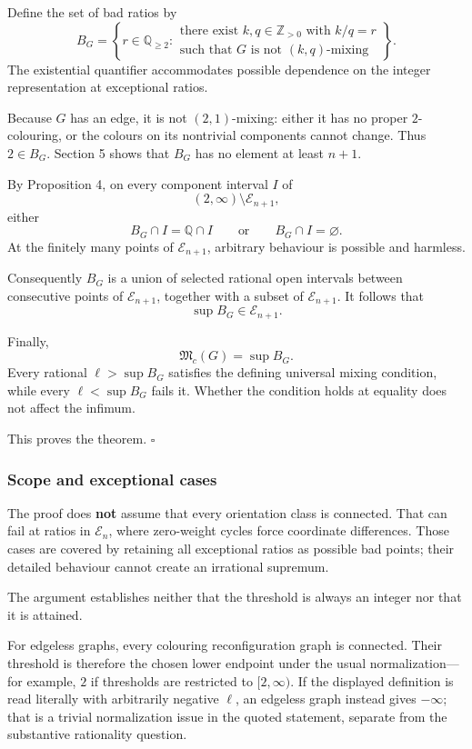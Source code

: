 \documentclass[
  11pt,
  a4paper,
]{article}
\begin{document}
Define the set of bad ratios by \[
B_G=
\left\{
r\in\mathbb Q_{\ge2}:
\begin{array}{l}
\text{there exist }k,q\in\mathbb Z_{>0}\text{ with }k/q=r\\
\text{such that }G\text{ is not }(k,q)\text{-mixing}
\end{array}
\right\}.
\] The existential quantifier accommodates possible dependence on the
integer representation at exceptional ratios.

Because \(G\) has an edge, it is not \((2,1)\)-mixing: either it has no
proper \(2\)-colouring, or the colours on its nontrivial components
cannot change. Thus \(2\in B_G\). Section 5 shows that \(B_G\) has no
element at least \(n+1\).

By Proposition 4, on every component interval \(I\) of \[
(2,\infty)\setminus\mathcal E_{n+1},
\] either \[
B_G\cap I=\mathbb Q\cap I
\qquad\text{or}\qquad
B_G\cap I=\varnothing.
\] At the finitely many points of \(\mathcal E_{n+1}\), arbitrary
behaviour is possible and harmless.

Consequently \(B_G\) is a union of selected rational open intervals
between consecutive points of \(\mathcal E_{n+1}\), together with a
subset of \(\mathcal E_{n+1}\). It follows that \[
\sup B_G\in\mathcal E_{n+1}.
\]

Finally, \[
\mathfrak M_c(G)=\sup B_G.
\] Every rational \(\ell>\sup B_G\) satisfies the defining universal
mixing condition, while every \(\ell<\sup B_G\) fails it. Whether the
condition holds at equality does not affect the infimum.

This proves the theorem. \(\square\)

\subsubsection{Scope and exceptional
cases}\label{scope-and-exceptional-cases}

The proof does \textbf{not} assume that every orientation class is
connected. That can fail at ratios in \(\mathcal E_n\), where
zero-weight cycles force coordinate differences. Those cases are covered
by retaining all exceptional ratios as possible bad points; their
detailed behaviour cannot create an irrational supremum.

The argument establishes neither that the threshold is always an integer
nor that it is attained.

For edgeless graphs, every colouring reconfiguration graph is connected.
Their threshold is therefore the chosen lower endpoint under the usual
normalization---for example, \(2\) if thresholds are restricted to
\([2,\infty)\). If the displayed definition is read literally with
arbitrarily negative \(\ell\), an edgeless graph instead gives
\(-\infty\); that is a trivial normalization issue in the quoted
statement, separate from the substantive rationality question.
\end{document}
